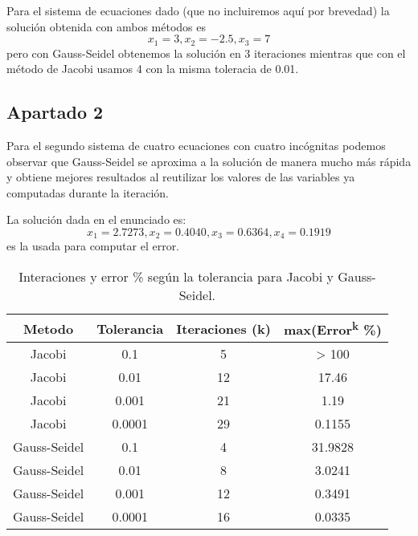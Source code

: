 Para el sistema de ecuaciones dado (que no incluiremos aquí por brevedad) la solución obtenida con ambos métodos es \[x_1=3 , x_2=-2.5 , x_3=7\] pero con Gauss-Seidel obtenemos la solución en 3 iteraciones mientras que con el método de Jacobi usamos 4 con la misma toleracia de 0.01.

\subsection{Apartado 2}

Para el segundo sistema de cuatro ecuaciones con cuatro incógnitas podemos observar que Gauss-Seidel se aproxima a la solución de manera mucho más rápida y obtiene mejores resultados al reutilizar los valores de las variables ya computadas durante la iteración.

La solución dada en el enunciado es: \[x_1=2.7273 , x_2 = 0.4040 , x_3 = 0.6364 , x_4 = 0.1919\] es la usada para computar el error.
\begin{table}
\begin{center}
\begin{tabular}{ |c|c|c|c| } 
 \hline 
 Metodo & Tolerancia & Iteraciones (k) & max(Error\textsuperscript{k} \%) \\ 
 \hline \hline
 Jacobi &  0.1 & 5 & > 100 \\
 \hline
 Jacobi &  0.01 & 12 & 17.46\\
 \hline
 Jacobi &  0.001 & 21 & 1.19\\
 \hline
 Jacobi &  0.0001 & 29 & 0.1155\\
 \hline
 Gauss-Seidel & 0.1 & 4 & 31.9828\\
 \hline
 Gauss-Seidel & 0.01 & 8 & 3.0241\\
 \hline
 Gauss-Seidel & 0.001 & 12 & 0.3491\\
 \hline
 Gauss-Seidel & 0.0001 & 16 &  0.0335\\
 \hline
\end{tabular}
\end{center}
\caption{Interaciones y error \% según la tolerancia para Jacobi y Gauss-Seidel.}
\end{table}